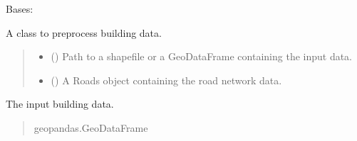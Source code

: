 \documentclass[letterpaper,10pt,english]{sphinxmanual}
\begin{document}
\begin{fulllineitems}
\label{\detokenize{pysewer:pysewer.preprocessing.Buildings}}
\pysigstartsignatures
{}
\pysigstopsignatures
\sphinxAtStartPar
Bases: 

\sphinxAtStartPar
A class to preprocess building data.
\begin{quote}\begin{description}
\begin{itemize}
\item {} 
\sphinxAtStartPar
{} () \textendash{} Path to a shapefile or a GeoDataFrame containing the input data.

\item {} 
\sphinxAtStartPar
{} () \textendash{} A Roads object containing the road network data.

\end{itemize}

\end{description}\end{quote}

\begin{fulllineitems}
\label{\detokenize{pysewer:pysewer.preprocessing.Buildings.gdf}}
\pysigstartsignatures
{}
\pysigstopsignatures
\sphinxAtStartPar
The input building data.
\begin{quote}\begin{description}
\sphinxAtStartPar
geopandas.GeoDataFrame

\end{description}\end{quote}


\end{fulllineitems}
\end{fulllineitems}
\end{document}
